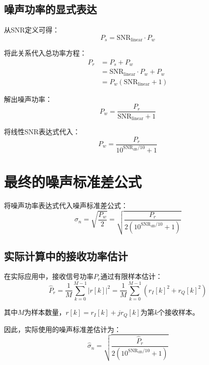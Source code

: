 \documentclass[12pt]{article}
\begin{document}
\subsection{噪声功率的显式表达}

从SNR定义可得：
\begin{equation}
P_s = \text{SNR}_{\text{linear}} \cdot P_w
\end{equation}

将此关系代入总功率方程：
\begin{align}
P_r &= P_s + P_w \\
&= \text{SNR}_{\text{linear}} \cdot P_w + P_w \\
&= P_w(\text{SNR}_{\text{linear}} + 1)
\end{align}

解出噪声功率：
\begin{equation}
P_w = \frac{P_r}{\text{SNR}_{\text{linear}} + 1}
\end{equation}

将线性SNR表达式代入：
\begin{equation}
P_w = \frac{P_r}{10^{\text{SNR}_{\text{dB}}/10} + 1}
\end{equation}

\section{最终的噪声标准差公式}

将噪声功率表达式代入噪声标准差公式：
\begin{equation}
\sigma_n = \sqrt{\frac{P_w}{2}} = \sqrt{\frac{P_r}{2(10^{\text{SNR}_{\text{dB}}/10} + 1)}}
\end{equation}

\subsection{实际计算中的接收功率估计}

在实际应用中，接收信号功率$P_r$通过有限样本估计：
\begin{equation}
\hat{P}_r = \frac{1}{M}\sum_{k=0}^{M-1}|r[k]|^2 = \frac{1}{M}\sum_{k=0}^{M-1}(r_I[k]^2 + r_Q[k]^2)
\end{equation}

其中$M$为样本数量，$r[k] = r_I[k] + jr_Q[k]$为第$k$个接收样本。

因此，实际使用的噪声标准差估计为：
\begin{equation}
\hat{\sigma}_n = \sqrt{\frac{\hat{P}_r}{2(10^{\text{SNR}_{\text{dB}}/10} + 1)}}
\end{equation}
\end{document}
